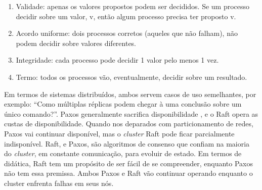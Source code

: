 
\begin{enumerate}
\item Validade: apenas os valores propostos podem ser decididos. Se um processo decidir sobre um valor, v, então algum processo precisa ter proposto v.
\item Acordo uniforme: dois processos corretos (aqueles que não falham), não podem decidir sobre valores diferentes.
\item Integridade: cada processo pode decidir 1 valor pelo menos 1 vez.
\item Termo: todos os processos vão, eventualmente, decidir sobre um resultado.
\end{enumerate}


Em termos de sistemas distribuídos, ambos servem casos de uso semelhantes, por exemplo: ``Como múltiplas réplicas podem chegar à uma conclusão sobre um único comando?''. Paxos generalmente sacrifica disponibilidade \cite{cason2017role}, e o Raft opera as custas de disponibilidade. Quando nos deparados com particionamento de redes, Paxos vai continuar disponível, mas o \textit{cluster} Raft pode ficar parcialmente indisponível. Raft, e Paxos, são algoritmos de consenso que confiam na maioria do \textit{cluster}, em constante comunicação, para evoluir de estado. Em termos de didática, Raft tem um propósito de ser fácil de se compreender, enquanto Paxos não tem essa premissa. Ambos Paxos e Raft vão continuar operando enquanto o cluster enfrenta falhas em seus nós.